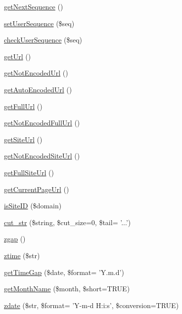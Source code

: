 \begin{DoxyCompactItemize}
\hyperlink{func_8inc_8php_a5a97b458f9c5b4fe3574671840aee27c}{get\-Next\-Sequence} ()
\item 
\hyperlink{func_8inc_8php_aa3832c4893dae39987cf056c24c29392}{set\-User\-Sequence} (\$seq)
\item 
\hyperlink{func_8inc_8php_a56536fb66de4e320aaac07b82e6c2e21}{check\-User\-Sequence} (\$seq)
\item 
\hyperlink{func_8inc_8php_accd14bda49a1044b4d8dd93f020f11ee}{get\-Url} ()
\item 
\hyperlink{func_8inc_8php_aa73dbeb07c5bcac26c24fe4c6b05d8d2}{get\-Not\-Encoded\-Url} ()
\item 
\hyperlink{func_8inc_8php_a77e631a54eea5ecea3a77feb56129104}{get\-Auto\-Encoded\-Url} ()
\item 
\hyperlink{func_8inc_8php_acaf8f155dd27e065b7fb0f5c3f702027}{get\-Full\-Url} ()
\item 
\hyperlink{func_8inc_8php_a06116450c538bd1f67cf3209bfd16610}{get\-Not\-Encoded\-Full\-Url} ()
\item 
\hyperlink{func_8inc_8php_a2d80ea9652d1586d5dcd03d022150f73}{get\-Site\-Url} ()
\item 
\hyperlink{func_8inc_8php_aa09cef59156d4afaeee54a675605f95d}{get\-Not\-Encoded\-Site\-Url} ()
\item 
\hyperlink{func_8inc_8php_a778b55fa9ebcf9a5ef0b017b998d9894}{get\-Full\-Site\-Url} ()
\item 
\hyperlink{func_8inc_8php_ae9a94dea2a8e11ebf9010683a124fabf}{get\-Current\-Page\-Url} ()
\item 
\hyperlink{func_8inc_8php_aa85a46b82e60cc2c64682ea6464eeeff}{is\-Site\-I\-D} (\$domain)
\item 
\hyperlink{func_8inc_8php_ad7b240a38cc63f3a576d4b7c391fda16}{cut\-\_\-str} (\$string, \$cut\-\_\-size=0, \$tail= '...')
\item 
\hyperlink{func_8inc_8php_acac2e71b99c40a4736c3ba62c0b8ac70}{zgap} ()
\item 
\hyperlink{func_8inc_8php_afa835b7d80cf54db78fd0cb7d81c7968}{ztime} (\$str)
\item 
\hyperlink{func_8inc_8php_a8c68983e66e199e8b7f1b5dad8f0c3ab}{get\-Time\-Gap} (\$date, \$format= 'Y.\-m.\-d')
\item 
\hyperlink{func_8inc_8php_adc2ced210718f27abac98392564a7b82}{get\-Month\-Name} (\$month, \$short=T\-R\-U\-E)
\item 
\hyperlink{func_8inc_8php_acccf91c81ea5145f4704bdd53421917b}{zdate} (\$str, \$format= 'Y-\/m-\/d H\-:i\-:s', \$conversion=T\-R\-U\-E)
\item 

\end{DoxyCompactItemize}
